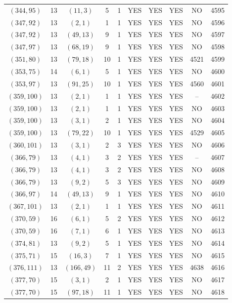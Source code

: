 \begin{longtable}{|c|c|c|c|c|c|c|c|c|c|}
$(344, 95)$ & 13 & $(11, 3)$ & 5 & 1 & YES & YES & YES & NO & 4595\\
$(347, 92)$ & 13 & $(2, 1)$ & 1 & 1 & YES & YES & YES & NO & 4596\\
$(347, 92)$ & 13 & $(49, 13)$ & 9 & 1 & YES & YES & YES & NO & 4597\\
$(347, 97)$ & 13 & $(68, 19)$ & 9 & 1 & YES & YES & YES & NO & 4598\\
$(351, 80)$ & 13 & $(79, 18)$ & 10 & 1 & YES & YES & YES & 4521 & 4599\\
$(353, 75)$ & 14 & $(6, 1)$ & 5 & 1 & YES & YES & YES & NO & 4600\\
$(353, 97)$ & 13 & $(91, 25)$ & 10 & 1 & YES & YES & YES & 4560 & 4601\\
$(359, 100)$ & 13 & $(2, 1)$ & 1 & 1 & YES & YES & YES & -- & 4602\\
$(359, 100)$ & 13 & $(2, 1)$ & 1 & 1 & YES & YES & YES & NO & 4603\\
$(359, 100)$ & 13 & $(3, 1)$ & 2 & 1 & YES & YES & YES & NO & 4604\\
$(359, 100)$ & 13 & $(79, 22)$ & 10 & 1 & YES & YES & YES & 4529 & 4605\\
$(360, 101)$ & 13 & $(3, 1)$ & 2 & 3 & YES & YES & YES & NO & 4606\\
$(366, 79)$ & 13 & $(4, 1)$ & 3 & 2 & YES & YES & YES & -- & 4607\\
$(366, 79)$ & 13 & $(4, 1)$ & 3 & 2 & YES & YES & YES & NO & 4608\\
$(366, 79)$ & 13 & $(9, 2)$ & 5 & 3 & YES & YES & YES & NO & 4609\\
$(366, 97)$ & 14 & $(49, 13)$ & 9 & 1 & YES & YES & YES & NO & 4610\\
$(367, 101)$ & 13 & $(2, 1)$ & 1 & 1 & YES & YES & YES & NO & 4611\\
$(370, 59)$ & 16 & $(6, 1)$ & 5 & 2 & YES & YES & YES & NO & 4612\\
$(370, 59)$ & 16 & $(7, 1)$ & 6 & 1 & YES & YES & YES & NO & 4613\\
$(374, 81)$ & 13 & $(9, 2)$ & 5 & 1 & YES & YES & YES & NO & 4614\\
$(375, 71)$ & 15 & $(16, 3)$ & 7 & 1 & YES & YES & YES & NO & 4615\\
$(376, 111)$ & 13 & $(166, 49)$ & 11 & 2 & YES & YES & YES & 4638 & 4616\\
$(377, 70)$ & 15 & $(3, 1)$ & 2 & 1 & YES & YES & YES & NO & 4617\\
$(377, 70)$ & 15 & $(97, 18)$ & 11 & 1 & YES & YES & YES & NO & 4618\\

\end{longtable}
